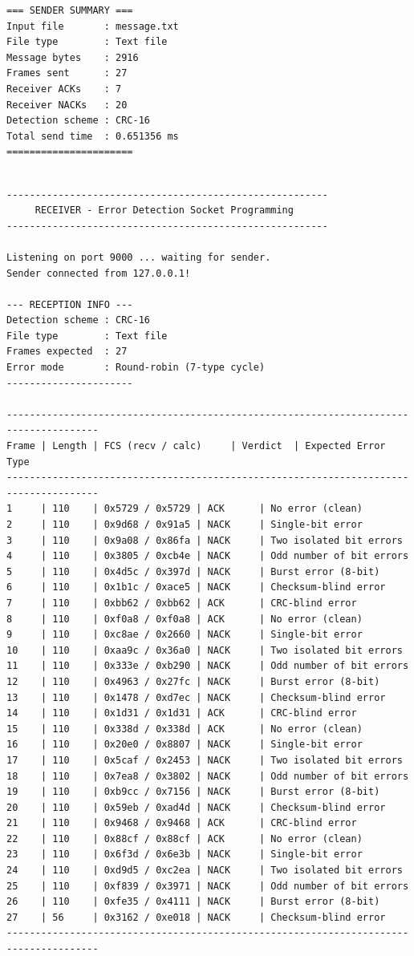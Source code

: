 \documentclass[12pt, a4paper]{article}
\begin{document}
\begin{scriptsize}
\begin{verbatim}
=== SENDER SUMMARY ===
Input file       : message.txt
File type        : Text file
Message bytes    : 2916
Frames sent      : 27
Receiver ACKs    : 7
Receiver NACKs   : 20
Detection scheme : CRC-16
Total send time  : 0.651356 ms
======================

\end{verbatim}
\end{scriptsize}

\begin{scriptsize}
\begin{verbatim}

--------------------------------------------------------
     RECEIVER - Error Detection Socket Programming      
--------------------------------------------------------

Listening on port 9000 ... waiting for sender.
Sender connected from 127.0.0.1!

--- RECEPTION INFO ---
Detection scheme : CRC-16
File type        : Text file
Frames expected  : 27
Error mode       : Round-robin (7-type cycle)
----------------------

--------------------------------------------------------------------------------------
Frame | Length | FCS (recv / calc)     | Verdict  | Expected Error Type           
--------------------------------------------------------------------------------------
1     | 110    | 0x5729 / 0x5729 | ACK      | No error (clean)
2     | 110    | 0x9d68 / 0x91a5 | NACK     | Single-bit error
3     | 110    | 0x9a08 / 0x86fa | NACK     | Two isolated bit errors
4     | 110    | 0x3805 / 0xcb4e | NACK     | Odd number of bit errors
5     | 110    | 0x4d5c / 0x397d | NACK     | Burst error (8-bit)
6     | 110    | 0x1b1c / 0xace5 | NACK     | Checksum-blind error
7     | 110    | 0xbb62 / 0xbb62 | ACK      | CRC-blind error
8     | 110    | 0xf0a8 / 0xf0a8 | ACK      | No error (clean)
9     | 110    | 0xc8ae / 0x2660 | NACK     | Single-bit error
10    | 110    | 0xaa9c / 0x36a0 | NACK     | Two isolated bit errors
11    | 110    | 0x333e / 0xb290 | NACK     | Odd number of bit errors
12    | 110    | 0x4963 / 0x27fc | NACK     | Burst error (8-bit)
13    | 110    | 0x1478 / 0xd7ec | NACK     | Checksum-blind error
14    | 110    | 0x1d31 / 0x1d31 | ACK      | CRC-blind error
15    | 110    | 0x338d / 0x338d | ACK      | No error (clean)
16    | 110    | 0x20e0 / 0x8807 | NACK     | Single-bit error
17    | 110    | 0x5caf / 0x2453 | NACK     | Two isolated bit errors
18    | 110    | 0x7ea8 / 0x3802 | NACK     | Odd number of bit errors
19    | 110    | 0xb9cc / 0x7156 | NACK     | Burst error (8-bit)
20    | 110    | 0x59eb / 0xad4d | NACK     | Checksum-blind error
21    | 110    | 0x9468 / 0x9468 | ACK      | CRC-blind error
22    | 110    | 0x88cf / 0x88cf | ACK      | No error (clean)
23    | 110    | 0x6f3d / 0x6e3b | NACK     | Single-bit error
24    | 110    | 0xd9d5 / 0xc2ea | NACK     | Two isolated bit errors
25    | 110    | 0xf839 / 0x3971 | NACK     | Odd number of bit errors
26    | 110    | 0xfe35 / 0x4111 | NACK     | Burst error (8-bit)
27    | 56     | 0x3162 / 0xe018 | NACK     | Checksum-blind error
--------------------------------------------------------------------------------------


\end{verbatim}
\end{scriptsize}
\end{document}
